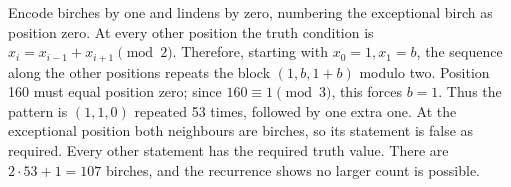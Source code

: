 Encode birches by one and lindens by zero, numbering the exceptional birch as position zero. At every other position the truth condition is $x_i=x_{i-1}+x_{i+1}\pmod2$. Therefore, starting with $x_0=1,x_1=b$, the sequence along the other positions repeats the block $(1,b,1+b)$ modulo two. Position 160 must equal position zero; since $160\equiv1\pmod3$, this forces $b=1$. Thus the pattern is $(1,1,0)$ repeated 53 times, followed by one extra one. At the exceptional position both neighbours are birches, so its statement is false as required. Every other statement has the required truth value. There are $2\cdot53+1=\boxed{107}$ birches, and the recurrence shows no larger count is possible.
